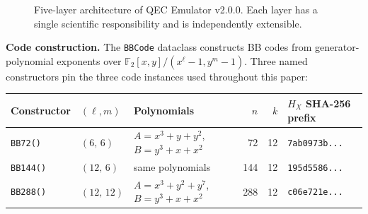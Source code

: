 \documentclass[pdflatex,sn-mathphys-num]{sn-jnl}
\theoremstyle{thmstyleone}
\theoremstyle{thmstyletwo}
\theoremstyle{thmstylethree}
\begin{document}
\begin{figure}[H]

    \vspace{0.5cm}
    \caption{Five-layer architecture of QEC Emulator v2.0.0. Each layer has a single scientific responsibility and is independently extensible.}
    \label{fig:emulator-arch}
\end{figure}

\noindent\textbf{Code construction.}
The \texttt{BBCode} dataclass constructs BB codes from generator-polynomial exponents over $\mathbb{F}_2[x,y]/(x^\ell-1,y^m-1)$. Three named constructors pin the three code instances used throughout this paper:

\begin{center}
\small
\begin{tabular}{@{}lllrrl@{}}
\toprule
Constructor & $(\ell,m)$ & Polynomials & $n$ & $k$ & $H_X$ SHA-256 prefix \\
\midrule
\texttt{BB72()}  & $(6,\,6)$   & $A=x^3+y+y^2$, $B=y^3+x+x^2$ & 72  & 12 & \texttt{7ab0973b...} \\
\texttt{BB144()} & $(12,\,6)$  & same polynomials               & 144 & 12 & \texttt{195d5586...} \\
\texttt{BB288()} & $(12,\,12)$ & $A=x^3+y^2+y^7$, $B=y^3+x+x^2$ & 288 & 12 & \texttt{c06e721e...} \\
\bottomrule
\end{tabular}
\end{center}
\end{document}
